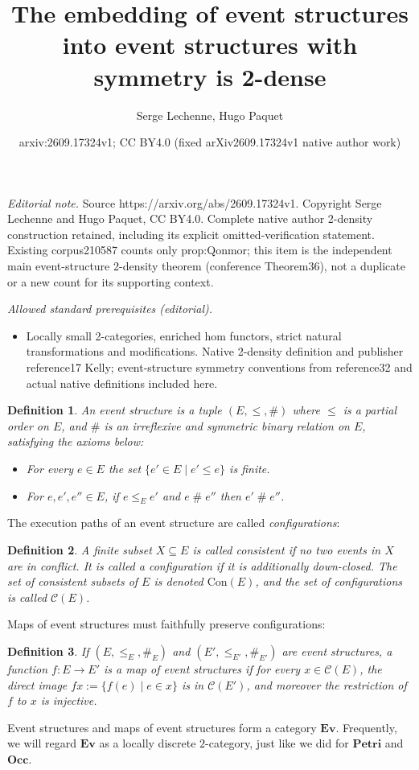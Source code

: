 \documentclass[10pt,a4paper]{amsart}
\title{The embedding of event structures into event structures with symmetry is 2-dense}
\author{Serge Lechenne, Hugo Paquet}
\date{arxiv:2609.17324v1; CC BY4.0 (fixed arXiv2609.17324v1 native author work)}
\newtheorem*{definition}{Definition}
\newcommand{\ES}{\mathbf{Ev}}
\newcommand{\Con}{\mathrm{Con}}
\newcommand{\conf}{\mathscr C}
\newcommand{\Petri}{\mathbf{Petri}}
\newcommand{\Occ}{\mathbf{Occ}}
\begin{document}
\maketitle
\noindent\textit{Editorial note.} Source https://arxiv.org/abs/2609.17324v1. Copyright Serge Lechenne and Hugo Paquet, CC BY4.0. Complete native author 2-density construction retained, including its explicit omitted-verification statement. Existing corpus210587 counts only prop:Qonmor; this item is the independent main event-structure 2-density theorem (conference Theorem36), not a duplicate or a new count for its supporting context.\par\medskip
\noindent\textit{Allowed standard prerequisites (editorial).}\begin{itemize}
\item Locally small 2-categories, enriched hom functors, strict natural transformations and modifications. Native 2-density definition and publisher reference17 Kelly; event-structure symmetry conventions from reference32 and actual native definitions included here.
\end{itemize}\medskip
\begin{definition}
An \emph{event structure} is a tuple $(E, {\leq}, \#)$ where $\leq$ is a partial order on $E$, and $\#$  is an irreflexive and symmetric binary relation on $E$, satisfying the axioms below:
\begin{itemize}
    \item For every $e \in E$  the set $\{e' \in E \mid e' \leq e \}$ is finite.
    \item For $e, e', e'' \in E$, if $e \leq_{E} e'$ and $e \mathrel{\#} e''$ then $e' \mathrel{\#} e''$.
\end{itemize}
\end{definition}
The execution paths of an event structure are called \emph{configurations}:
\begin{definition}
    A finite subset $X \subseteq E$ is called \emph{consistent} if no two events in $X$ are in conflict. It is called a \emph{configuration} if it is additionally down-closed. The set of consistent subsets of $E$ is denoted $\Con(E)$, and the set of configurations is called $\conf(E)$.
\end{definition}
Maps of event structures must faithfully preserve configurations:
\begin{definition}
    If $(E, \leq_E, \#_E)$ and $(E', \leq_{E'}, \#_{E'})$ are event structures, a function $f: E \rightarrow E'$ is a \emph{map of event structures} if for every $x \in \conf(E)$, the direct image $fx := \{f(e) \mid e \in x\}$ is in $\conf(E')$, and moreover the restriction of $f$ to $x$ is injective.
\end{definition}
Event structures and maps of event structures form a category $\ES$. Frequently, we will regard $\ES$ as a locally discrete $2$-category, just like we did for $\Petri$ and $\Occ$.
\end{document}
